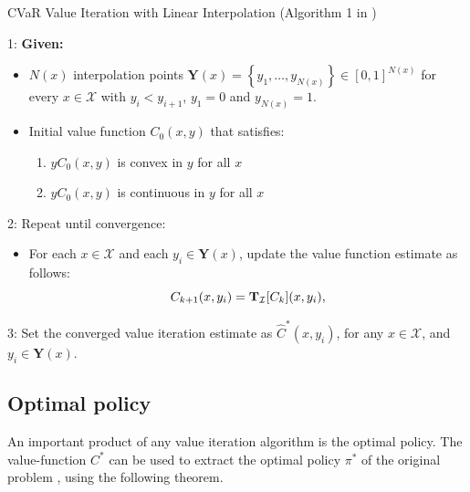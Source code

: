 \begin{algorithm}[h]
\caption{CVaR Value Iteration with Linear Interpolation (Algorithm 1 in \citep{chow2015risk})}
\label{alg:cvarlinear}
1: \textbf{Given:}
\begin{itemize}
\item $N(x)$ interpolation points $\mathbf{Y}(x)  = \left\{y_1,\dots,y_{N(x)}\right\} \in [0,1]^{N(x)}$ for every $x\in \mathcal X$ with $y_i<y_{i+1}$, $y_1=0$ and $y_{N(x)}=1$.
\item Initial value function $C_0(x,y)$ that satisfies:
\begin{enumerate}
\item $yC_0(x,y)$ is convex in $y$ for all $x$
\item $yC_0(x,y)$ is continuous in $y$ for all $x$
\end{enumerate}
\end{itemize}
2: Repeat until convergence:
\begin{itemize}
\item For each $x \in \mathcal X$ and each $y_i\in \mathbf{Y}(x)$, update the value function estimate as follows:
  \begin{equation*}
   C_{k+1}(x,y_i)= \mathbf{T}_{\mathcal{I}}[C_k](x,y_i),
  \end{equation*}
  \end{itemize}
3: Set the converged value iteration estimate as $\widehat{C}^*(x,y_i)$, for any $x\in\mathcal X$, and $ y_i\in\mathbf{Y}(x)$.
\end{algorithm}

\subsection{Optimal policy}
An important product of any value iteration algorithm is the optimal policy. The value-function $C^*$ can be used to extract the optimal policy $\pi^*$ of the original problem , using the following theorem.

